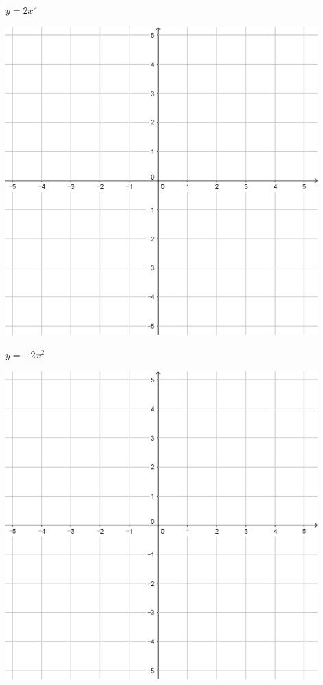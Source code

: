 \documentclass[a4paper]{oblivoir}
\begin{document}
\begin{minipage}{0.45\textwidth}\centering
\(y=2x^2\)
\par\bigskip\includegraphics[width=0.9\textwidth]{55}
\end{minipage}
\begin{minipage}{0.45\textwidth}\centering
\(y=-2x^2\)
\par\bigskip\includegraphics[width=0.9\textwidth]{55}
\end{minipage}\bigskip\bigskip\par
\end{document}
